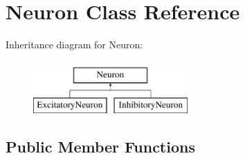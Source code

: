 \hypertarget{classNeuron}{\section{Neuron Class Reference}
\label{classNeuron}
}
Inheritance diagram for Neuron\-:\begin{figure}[H]
\begin{center}
\leavevmode
\includegraphics[height=2.000000cm]{classNeuron}
\end{center}
\end{figure}
\subsection*{Public Member Functions}
